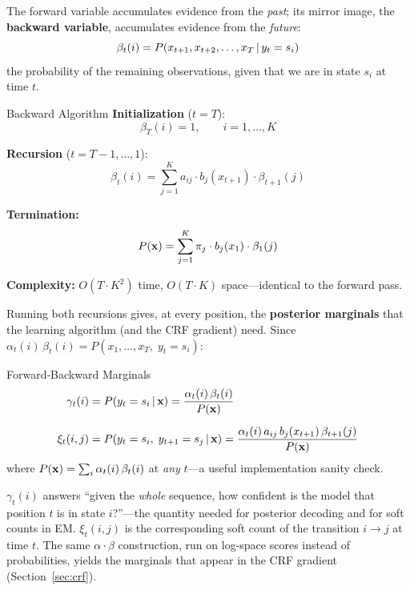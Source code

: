 The forward variable accumulates evidence from the \emph{past}; its mirror
image, the \textbf{backward variable}, accumulates evidence from the
\emph{future}:
\[
\beta_t(i) = P(x_{t+1}, x_{t+2}, \ldots, x_T \,|\, y_t = s_i)
\]
the probability of the remaining observations, given that we are in state
$s_i$ at time $t$.

\begin{mathresult}{Backward Algorithm}
\textbf{Initialization} ($t = T$):
\begin{equation}
\beta_T(i) = 1, \qquad i = 1, \ldots, K
\label{eq:backward_init}
\end{equation}

\textbf{Recursion} ($t = T{-}1, \ldots, 1$):
\begin{equation}
\beta_t(i) = \sum_{j=1}^{K} a_{ij} \cdot b_j(x_{t+1}) \cdot \beta_{t+1}(j)
\label{eq:backward_recursion}
\end{equation}

\textbf{Termination:}
\begin{equation}
P(\mathbf{x}) = \sum_{j=1}^{K} \pi_j \cdot b_j(x_1) \cdot \beta_1(j)
\label{eq:backward_termination}
\end{equation}

\textbf{Complexity:} $O(T \cdot K^2)$ time, $O(T \cdot K)$ space---identical
to the forward pass.
\end{mathresult}

Running both recursions gives, at every position, the \textbf{posterior
marginals} that the learning algorithm (and the CRF gradient) need.  Since
$\alpha_t(i)\,\beta_t(i) = P(x_1, \ldots, x_T,\; y_t = s_i)$:

\begin{mathresult}{Forward-Backward Marginals}
\begin{align}
\gamma_t(i) &= P(y_t = s_i \,|\, \mathbf{x})
= \frac{\alpha_t(i)\,\beta_t(i)}{P(\mathbf{x})}
\label{eq:gamma} \\[6pt]
\xi_t(i,j) &= P(y_t = s_i,\; y_{t+1} = s_j \,|\, \mathbf{x})
= \frac{\alpha_t(i)\, a_{ij}\, b_j(x_{t+1})\, \beta_{t+1}(j)}{P(\mathbf{x})}
\label{eq:xi}
\end{align}
where $P(\mathbf{x}) = \sum_i \alpha_t(i)\,\beta_t(i)$ at \emph{any} $t$---a useful
implementation sanity check.
\end{mathresult}

$\gamma_t(i)$ answers ``given the \emph{whole} sequence, how confident is the
model that position $t$ is in state $i$?''---the quantity needed for posterior
decoding and for soft counts in EM.  $\xi_t(i,j)$ is the corresponding soft
count of the transition $i \to j$ at time $t$.  The same
$\alpha \cdot \beta$ construction, run on log-space scores instead of
probabilities, yields the marginals that appear in the CRF gradient
(Section~\ref{sec:crf}).

